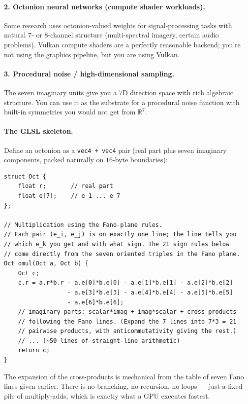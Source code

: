 \documentclass[11pt]{article}
\newcommand{\R}{\mathbb{R}}
\begin{document}
\paragraph{2. Octonion neural networks (compute shader workloads).}
Some research uses octonion-valued weights for signal-processing
tasks with natural $7$- or $8$-channel structure (multi-spectral
imagery, certain audio problems). Vulkan compute shaders are a
perfectly reasonable backend; you're not using the graphics pipeline,
but you are using Vulkan.

\paragraph{3. Procedural noise / high-dimensional sampling.}
The seven imaginary units give you a $7$D direction space with rich
algebraic structure. You can use it as the substrate for a procedural
noise function with built-in symmetries you would not get from
$\R^7$.

\paragraph{The GLSL skeleton.} Define an octonion as a \texttt{vec4 +
vec4} pair (real part plus seven imaginary components, packed
naturally on $16$-byte boundaries):

\begin{verbatim}
struct Oct {
    float r;       // real part
    float e[7];    // e_1 ... e_7
};

// Multiplication using the Fano-plane rules.
// Each pair (e_i, e_j) is on exactly one line; the line tells you
// which e_k you get and with what sign. The 21 sign rules below
// come directly from the seven oriented triples in the Fano plane.
Oct omul(Oct a, Oct b) {
    Oct c;
    c.r = a.r*b.r - a.e[0]*b.e[0] - a.e[1]*b.e[1] - a.e[2]*b.e[2]
                  - a.e[3]*b.e[3] - a.e[4]*b.e[4] - a.e[5]*b.e[5]
                  - a.e[6]*b.e[6];
    // imaginary parts: scalar*imag + imag*scalar + cross-products
    // following the Fano lines. (Expand the 7 lines into 7*3 = 21
    // pairwise products, with anticommutativity giving the rest.)
    // ... (~50 lines of straight-line arithmetic)
    return c;
}
\end{verbatim}

The expansion of the cross-products is mechanical from the table of
seven Fano lines given earlier. There is no branching, no recursion,
no loops --- just a fixed pile of multiply-adds, which is exactly
what a GPU executes fastest.
\end{document}
